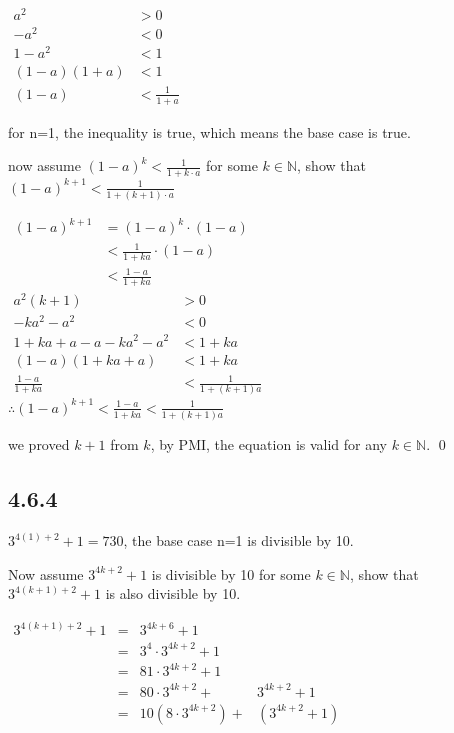 \documentclass{article}
\begin{document}
\begin{center}
    $\begin{aligned}a^{2}&>0\\-a^{2}&<0\\1-a^{2}&<1\\(1-a)(1+a)&<1\\(1-a)&<\frac{1}{1+a}\end{aligned}$
\end{center}

for n=1, the inequality is true, which means the base case is true.

now assume $(1-a)^k<\frac1{1+k\cdot a}$ for some $k\in \mathbb{N}$, show that $(1-a)^{k+1}<\frac1{1+(k+1)\cdot a}$

\begin{center}
    $\begin{aligned}\left(1-a\right)^{k+1}&=\left(1-a\right)^{k}\cdot\left(1-a\right)\\&<\frac1{1+ka}\cdot\left(1-a\right)\\&<\frac{1-a}{1+ka}\end{aligned}$\\
    $\begin{aligned}a^{2}(k+1)&>0\\-ka^{2}-a^{2}&<0\\1+ka+a-a-ka^{2}-a^{2}&<1+ka\\(1-a)(1+ka+a)&<1+ka\\\frac{1-a}{1+ka}&<\frac{1}{1+(k+1)a}\end{aligned}$\\
    $\therefore(1-a)^{k+1}<\frac{1-a}{1+ka}<\frac{1}{1+(k+1)a}$
\end{center}

we proved $k+1$ from $k$, by PMI, the equation is valid for any $k\in \mathbb{N}$. \qed

\subsection*{4.6.4}

$3^{4(1)+2}+1=730$, the base case n=1 is divisible by 10.

Now assume $3^{4k+2}+1$ is divisible by 10 for some $k \in \mathbb{N}$, show that $3^{4(k+1)+2}+1$ is also divisible by 10.

\begin{center}
    $\begin{aligned}3^{4(k+1)+2}+1&=&3^{4k+6}+1\\&=&3^4\cdot3^{4k+2}+1\\&=&81\cdot3^{4k+2}+1\\&=&80\cdot3^{4k+2}+&3^{4k+2}+1\\&=&10\left(8\cdot3^{4k+2}\right)+&\left(3^{4k+2}+1\right)\end{aligned}$
\end{center}
\end{document}
